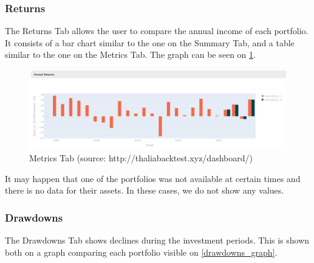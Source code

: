 \documentclass[main.tex]{subfiles}
\begin{document}
\subsubsection{Returns}



The Returns Tab allows the user to compare the annual income of each portfolio. It consists of a bar chart similar to the one on the Summary Tab, and a table similar to the one on the Metrics Tab. The graph can be seen on \figurename{\ref{returns}}.



\begin{figure}[H]

   \centering

   \includegraphics[width=\textwidth]{08Appendices/081User/081Pictures/returns_graph.png}

   \caption{Metrics Tab (source: http://thaliabacktest.xyz/dashboard/)}

   \label{returns}

\end{figure}



It may happen that one of the portfolios was not available at certain times and there is no data for their assets. In these cases, we do not show any values. 



\subsubsection{Drawdowns}



The Drawdowns Tab shows declines during the investment periods. This is shown both on a graph comparing each portfolio visible on \figurename{\ref{drawdowns_graph}}.
\end{document}
